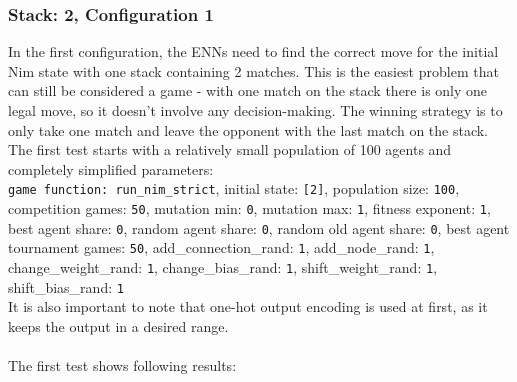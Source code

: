 \documentclass[11pt]{report}
\begin{document}
\begin{enumerate}
    \subsubsection{Stack: 2, Configuration 1}
    In the first configuration, the ENNs need to find the correct move for the initial Nim state with one stack containing 2 matches.
    This is the easiest problem that can still be considered a game - with one match on the stack there is only one legal move, so it doesn't involve any decision-making.
    The winning strategy is to only take one match and leave the opponent with the last match on the stack.
    The first test starts with a relatively small population of 100 agents and completely simplified parameters:
    \\
    \texttt{game function: run\_nim\_strict}, initial state: \texttt{[2]}, population size: \texttt{100}, competition games: \texttt{50}, mutation min: \texttt{0}, mutation max: \texttt{1}, fitness exponent: \texttt{1}, best agent share:
    \texttt{0}, random agent share: \texttt{0}, random old agent share: \texttt{0}, best agent tournament games: \texttt{50}, add\_connection\_rand: \texttt{1}, add\_node\_rand: \texttt{1}, change\_weight\_rand: \texttt{1}, change\_bias\_rand: \texttt{1}, shift\_weight\_rand: \texttt{1}, shift\_bias\_rand: \texttt{1}\\
    It is also important to note that one-hot output encoding is used at first, as it keeps the output in a desired range.
    \\ \\
    The first test shows following results:
    \\
    \newcommand{\csvpath}{../data/simple_nim/stack_2/t_1/stats.csv} %
    \begin{center}
\end{center}
\end{enumerate}
\end{document}
